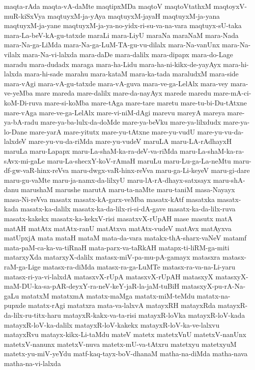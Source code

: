 {maqta-rAda
maqta-vA-daMte
maqtipxMDa
maqtoV
maqtoVtathxM
maqtoyxV-muR-kiSxVya
maqtuyxM-ja-yAya
maqtuyxM-jayaH
maqtuyxM-ja-yana
maqtuyxM-ja-yane
maqtuyxM-ja-ya-no-yidx-ri-su-va-na-vara
maqtuyx-sU-taka
mara-La-beV-kA-gu-tatxde
maraLi
mara-LiyU
maraNa
maraNaM
mara-Nada
mara-Na-ga-LiMda
mara-Na-ga-LuM-TA-gu-vu-dilalx
mara-Na-vanUnx
mara-Na-vilalx
mara-Na-vi-lalxda
mara-daDe
mara-dalilx
mara-dipapx
mara-do-Lage
maradu
mara-dudadx
maraga
mara-ha-Lidu
mara-ha-ni-kikx-de-yayAyx
mara-hi-lalxda
mara-hi-sade
marahu
mara-kataM
mara-ka-tada
maraludxM
mara-side
mara-vAgi
mara-vA-gu-tatxde
mara-vA-guva
mara-ve-ga-LelAlx
mara-vey
mara-ve-yeMba
mare
mareda
mare-dalilx
mare-da-nayAyx
marede
maredu
mare-mA-ci-koM-Di-ruva
mare-si-koMba
mare-tAga
mare-tare
maretu
mare-tu-bi-Du-tAtxne
mare-vAga
mare-ve-ga-LelAlx
mare-vi-niM-dAgi
marevu
mareyA
mareya
mare-ya-bA-radu
mare-ya-ba-lulx-da-doMde
mare-ya-beVku
mare-ya-lilxdudx
mare-ya-lo-Dane
mare-yarA
mare-yitutx
mare-yu-tAtxne
mare-yu-vudU
mare-yu-vu-da-lalxdeV
mare-yu-vu-da-riMda
mare-yu-vudeV
maruLA
maru-LA-rAdhayxH
maruLa
maru-Lapapx
maru-La-shaM-ka-ra-deV-va-riMda
maru-La-shaM-ka-ra-sAvx-mi-gaLe
maru-La-shecxY-koV-rAmaH
maruLu
maru-Lu-ga-La-neMtu
maru-df-gw-vaR-hinx-reVva
maru-dwgx-vaR-hinx-reVva
maru-ga-Li-keyeV
maru-gi-dare
maru-gu-vaMte
maru-ja-namx-da-lilxyU
maru-lA-rA-dhayx-satxsayx
maru-shA-danu
marushaM
marushe
marutA
maru-ta-naMte
maru-taniM
masa-Nayayx
masa-Ni-reVva
masatx
masatx-kA-garx-veMba
masatx-kAtf
masatxka
masatx-kada
masatx-ka-dalilx
masatx-ka-da-lilx-ri-si-dA-gave
masatx-ka-da-lilx-ruva
masatx-kakekx
masatx-ka-kekxV-risi
masatxvX-rUpAH
mase
masutx
matA
matAH
matAtx
matAtx-ranU
matAtxva
matAtx-vudeV
matAvx
matAyxva
matUpxjA
mata
mataH
mataM
mata-da-vara
matakx-thA-sharx-vaNeV
matamf
mata-paM-ca-ka-va-tiRnaH
mata-parx-va-taRkAH
matapx-ti-liRM-ga-miti
matarxyXda
matarxyX-dalilx
matasx-miV-pa-mu-pA-gamayx
matasxra
matasx-raM-ga-Lige
matasx-ra-diMda
matasx-ra-ga-LuMTe
matasx-ra-va-na-Li-yaru
matasx-ri-ya-vi-lalxdA
matasxvX-rUpA
matasxvX-rUpAH
matasxyX
matasxyX-maM-DU-ka-sa-pAR-deyxY-ra-neV-keY-jaR-la-jaM-tuBiH
matasxyX-pu-rA-Na-gaLu
matatxM
matatxmA
matatx-maMga
matatx-miM-teMdu
matatx-na-pupxde
matatx-rAgi
matatxra
mata-va-lalxvA
matayxRH
matayxRda
matayxR-da-lilx-ru-titx-haru
matayxR-kakx-va-ta-risi
matayxR-loVka
matayxR-loV-kada
matayxR-loV-ka-dalilx
matayxR-loV-kakekx
matayxR-loV-ka-ve-lalxvu
matayxRvu
matayx-kikx-Li-taMdu
mateV
matetx
matetxVnU
matetxV-nanUnx
matetxV-nanunx
matetxV-nuva
matetx-mU-va-tAtxru
matetxyu
matetxyuM
matetx-yu-miV-yeYdu
matf-kaq-tayx-boV-dhanaM
matha-na-diMda
matha-nava
matha-na-vi-lalxda
}
